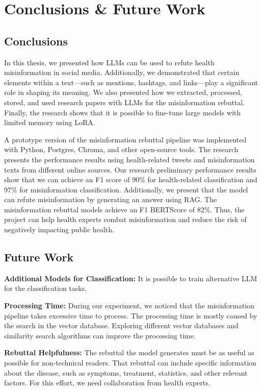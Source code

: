 



\chapter{Conclusions \& Future Work}  

\section{Conclusions}
\noindent In this thesis, we presented how LLMs can be used to refute health misinformation in social media. Additionally, we demonstrated that certain elements within a text—such as mentions, hashtags, and links—play a significant role in shaping its meaning. We also presented how we extracted, processed, stored, and used research papers with LLMs for the misinformation rebuttal. Finally, the research shows that it is possible to fine-tune large models with limited memory using LoRA.

A prototype version of the misinformation rebuttal pipeline was implemented with Python, Postgres, Chroma, and other open-source tools. The research presents the performance results using health-related tweets and misinformation texts from different online sources. Our research preliminary performance results show that we can achieve an F1 score of 90\% for health-related classification and 97\% for misinformation classification. Additionally, we present that the model can refute misinformation by generating an answer using RAG. The misinformation rebuttal models achieve an F1 BERTScore of 82\%. Thus, the project can help health experts combat misinformation and reduce the risk of negatively impacting public health.

\section{Future Work}

\begin{description}

\item{\textbf{Additional Models for Classification:}} It is possible to train alternative LLM  for the classification tasks.

\item{\textbf{Processing Time:}} During our experiment, we noticed that the misinformation pipeline takes excessive time to process. The processing time is mostly caused by the search in the vector database. Exploring different vector databases and similarity search algorithms can improve the processing time.

\item{\textbf{Rebuttal Helpfulness:}} The rebuttal the model generates must be as useful as possible for non-technical readers. That rebuttal can include specific information about the disease, such as symptoms, treatment, statistics, and other relevant factors. For this effort, we need 
collaboration from health experts.

\end{description}